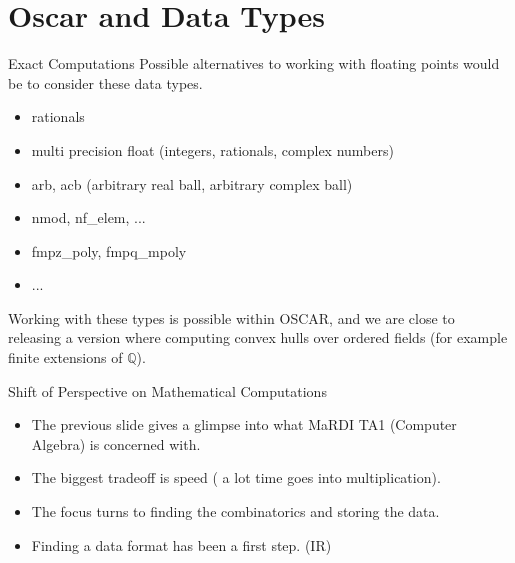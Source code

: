 \documentclass[9pt]{beamer}
\theoremstyle{definition}
\begin{document}
\section{Oscar and Data Types}

\begin{frame}[fragile]{Exact Computations}
  Possible alternatives to working with floating points would be to consider these
  data types.
  
  \begin{itemize}
  \item rationals
  \item multi precision float (integers, rationals, complex numbers)
  \item arb, acb (arbitrary real ball, arbitrary complex ball)
  \item nmod, nf\_elem, ...
  \item fmpz\_poly, fmpq\_mpoly
  \item ...
  \end{itemize}

  Working with these types is possible within OSCAR, and we are close to releasing
  a version where computing convex hulls over ordered fields (for example finite extensions of $\mathbb{Q}$). 
\end{frame}


\begin{frame}[fragile]{Shift of Perspective on Mathematical Computations}
  \begin{itemize}
    \item The previous slide gives a glimpse into what MaRDI TA1 (Computer Algebra) is concerned with.
    \item The biggest tradeoff is speed ( a lot time goes into multiplication).
    \item The focus turns to finding the combinatorics and storing the data.
    \item Finding a data format has been a first step. (IR)
  \end{itemize}
\end{frame}

\end{document}
